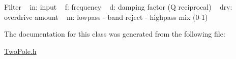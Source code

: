 Filter ~\newline
in\+: input ~\newline
f\+: frequency ~\newline
d\+: damping factor (Q reciprocal) ~\newline
drv\+: overdrive amount ~\newline
m\+: lowpass -\/ band reject -\/ highpass mix (0-\/1) ~\newline


The documentation for this class was generated from the following file\+:\begin{DoxyCompactItemize}
\item 
\hyperlink{_two_pole_8h}{Two\+Pole.\+h}\end{DoxyCompactItemize}
